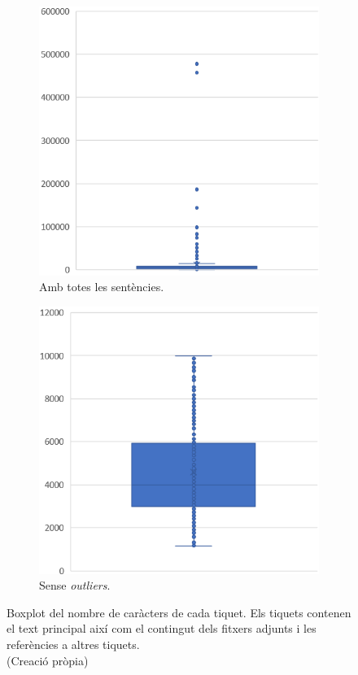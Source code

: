 \begin{figure}[H]
    \centering
    \begin{subfigure}{.5\textwidth}
      \centering
      \includegraphics[width=.7\linewidth]{boxplot_num_chars_adj_refs.png}
      \caption{Amb totes les sentències.}
      \label{fig:boxplot_num_chars_adj_refs}
    \end{subfigure}%
    \begin{subfigure}{.5\textwidth}
      \centering
      \includegraphics[width=.7\linewidth]{boxplot_num_chars_adj_refs_outliers.png}
      \caption{Sense \textit{outliers}.}
      \label{fig:boxplot_num_chars_adj_refs_outliers}
    \end{subfigure}
    \caption[Boxplot dels caràcters de cada tiquet amb adjunts i referències]{Boxplot del nombre de caràcters de cada tiquet. Els tiquets contenen el text principal així com el contingut dels fitxers adjunts i les referències a altres tiquets. \\ (Creació pròpia)}
    \label{fig:boxplot_num_chars_adj_refs_dos}
\end{figure}


